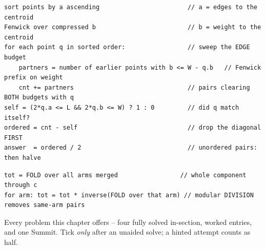 \begin{lstlisting}[caption={Drill 4 -- 2-D dominance pair count: sort on one axis, Fenwick the other (from lst:c18-293e)}]
sort points by a ascending                        // a = edges to the centroid
Fenwick over compressed b                         // b = weight to the centroid
for each point q in sorted order:                 // sweep the EDGE budget
    partners = number of earlier points with b <= W - q.b   // Fenwick prefix on weight
    cnt += partners                               // pairs clearing BOTH budgets with q
self = (2*q.a <= L && 2*q.b <= W) ? 1 : 0         // did q match itself?
ordered = cnt - self                              // drop the diagonal FIRST
answer  = ordered / 2                             // unordered pairs: then halve
\end{lstlisting}

\begin{lstlisting}[caption={Drill 5 -- product fold with same-arm correction (from lst:c18-833d)}]
tot = FOLD over all arms merged                 // whole component through c
for arm: tot = tot * inverse(FOLD over that arm) // modular DIVISION removes same-arm pairs
\end{lstlisting}


Every problem this chapter offers -- four fully solved in-section, worked entries, and one Summit.
Tick \emph{only} after an unaided solve; a hinted attempt counts as half.

